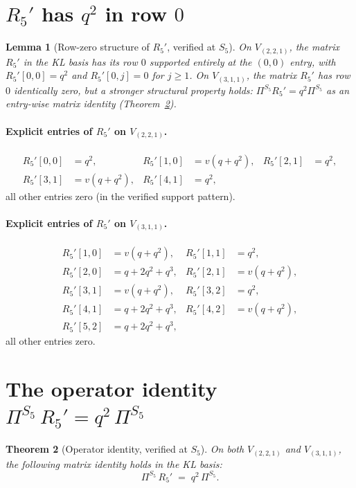 \documentclass[11pt]{article}
\newtheorem{theorem}{Theorem}
\newtheorem{lemma}[theorem]{Lemma}
\theoremstyle{definition}
\begin{document}
\section{$R_5'$ has $q^2$ in row $0$}\label{sec:R5prime}

\begin{lemma}[Row-zero structure of $R_5'$, verified at $S_5$]\label{lem:R5prime}
On $V_{(2,2,1)}$, the matrix $R_5'$ in the KL basis has its row $0$ supported entirely at the $(0,0)$ entry, with $R_5'[0,0] = q^2$ and $R_5'[0,j] = 0$ for $j \geq 1$. On $V_{(3,1,1)}$, the matrix $R_5'$ has row $0$ identically zero, but a stronger structural property holds: $\Pi^{S_5} R_5' = q^2 \Pi^{S_5}$ as an entry-wise matrix identity (Theorem~\ref{thm:operator}).
\end{lemma}

\paragraph{Explicit entries of $R_5'$ on $V_{(2,2,1)}$.}
\begin{align*}
R_5'[0,0] &= q^2, & R_5'[1,0] &= v(q+q^2), & R_5'[2,1] &= q^2, \\
R_5'[3,1] &= v(q+q^2), & R_5'[4,1] &= q^2,
\end{align*}
all other entries zero (in the verified support pattern).

\paragraph{Explicit entries of $R_5'$ on $V_{(3,1,1)}$.}
\begin{align*}
R_5'[1,0] &= v(q+q^2), & R_5'[1,1] &= q^2, \\
R_5'[2,0] &= q + 2q^2 + q^3, & R_5'[2,1] &= v(q+q^2), \\
R_5'[3,1] &= v(q+q^2), & R_5'[3,2] &= q^2, \\
R_5'[4,1] &= q + 2q^2 + q^3, & R_5'[4,2] &= v(q+q^2), \\
R_5'[5,2] &= q + 2q^2 + q^3,
\end{align*}
all other entries zero.

\section{The operator identity $\Pi^{S_5}\, R_5' = q^2\, \Pi^{S_5}$}\label{sec:operator}

\begin{theorem}[Operator identity, verified at $S_5$]\label{thm:operator}
On both $V_{(2,2,1)}$ and $V_{(3,1,1)}$, the following matrix identity holds in the KL basis:
\[
\Pi^{S_5}\, R_5' \;=\; q^2\, \Pi^{S_5}.
\]
\end{theorem}
\end{document}
